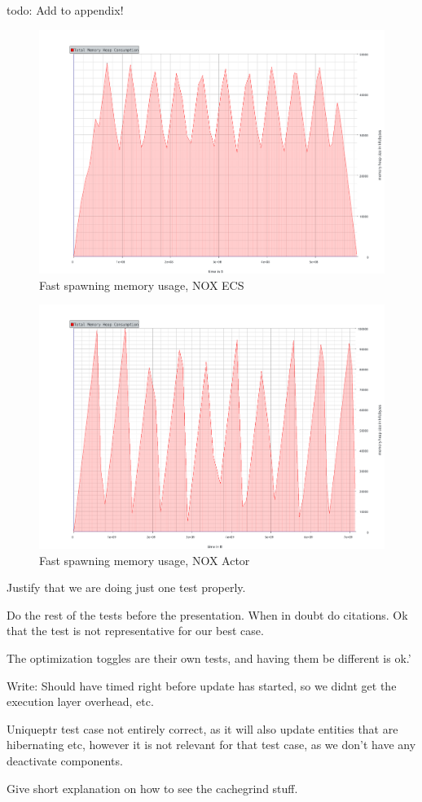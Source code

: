 \documentclass[BSP,english,oneside]{ntnuthesis/ntnubachelorthesis}
\newcommand{\todo}[1]{{\color{cyan}\lbrack todo: #1\rbrack}\\} %
\begin{document}
\todo{Add to appendix!}
\begin{figure}
    \includegraphics[scale=0.5]{benchmark_results/fast_spawn/ecs_massif_deletes_10.pdf}
    \caption{Fast spawning memory usage, NOX ECS}
    \label{fig:fast_spawning_memory_usage_nox_ecs}
\end{figure}

\begin{figure}
    \includegraphics[scale=0.5]{benchmark_results/fast_spawn/nox_massif_deletes_10.pdf}
    \caption{Fast spawning memory usage, NOX Actor}
    \label{fig:fast_spawning_memory_usage_nox_actor}
\end{figure}



Justify that we are doing just one test properly.


Do the rest of the tests before the presentation.
When in doubt do citations.
Ok that the test is not representative for our best case.

The optimization toggles are their own tests, and having them be different is ok.'


Write:
Should have timed right before update has started, so we didnt get the execution layer overhead, etc.

Uniqueptr test case not entirely correct, as it will also update entities that are hibernating etc,
however it is not relevant for that test case, as we don't have any deactivate components.

Give short explanation on how to see the cachegrind stuff.
\end{document}
